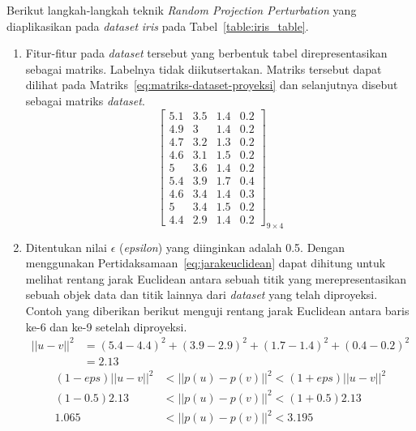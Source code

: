 Berikut langkah-langkah teknik \textit{Random Projection Perturbation} yang diaplikasikan pada \textit{dataset} \textit{iris} pada Tabel~\ref{table:iris_table}.
\begin{enumerate}
    \item Fitur-fitur pada \textit{dataset} tersebut yang berbentuk tabel direpresentasikan sebagai matriks. Labelnya tidak diikutsertakan. Matriks tersebut dapat dilihat pada Matriks~\ref{eq:matriks-dataset-proyeksi} dan selanjutnya disebut sebagai matriks \textit{dataset}.
    \begin{equation}\label{eq:matriks-dataset-proyeksi}
        \begin{bmatrix}
        5.1		&		3.5		&		1.4		&		0.2	\\
        4.9		&		3		&		1.4		&		0.2	\\
        4.7		&		3.2		&		1.3		&		0.2	\\
        4.6		&		3.1		&		1.5		&		0.2	\\
        5		&		3.6		&		1.4		&		0.2	\\
        5.4		&		3.9		&		1.7		&		0.4	\\
        4.6		&		3.4		&		1.4		&		0.3	\\
        5		&		3.4		&		1.5		&		0.2	\\
        4.4		&		2.9		&		1.4		&		0.2 
        \end{bmatrix}_{9\times 4}
    \end{equation}
    \item Ditentukan nilai \(\epsilon\) (\textit{epsilon}) yang diinginkan adalah 0.5. Dengan menggunakan Pertidaksamaan~\ref{eq:jarakeuclidean} dapat dihitung untuk melihat rentang jarak Euclidean antara sebuah titik yang merepresentasikan sebuah objek data dan titik lainnya dari \textit{dataset} yang telah diproyeksi. Contoh yang diberikan berikut menguji rentang jarak Euclidean antara baris ke-6 dan ke-9 setelah diproyeksi.
    \begin{align*}
        ||u - v||^{2} &= (5.4-4.4)^2 + (3.9-2.9)^2 + (1.7-1.4)^2 + (0.4-0.2)^2
        \\
        &= 2.13
    \end{align*}
    \begin{align*}
        (1-eps)||u - v||^{2}&<||p(u) - p(v)||^{2}<(1+eps)||u - v||^{2}
        \\
        (1-0.5)2.13&<||p(u) - p(v)||^{2}<(1+0.5)2.13
        \\
        1.065&<||p(u) - p(v)||^{2}<3.195
    \end{align*}

\end{enumerate}
